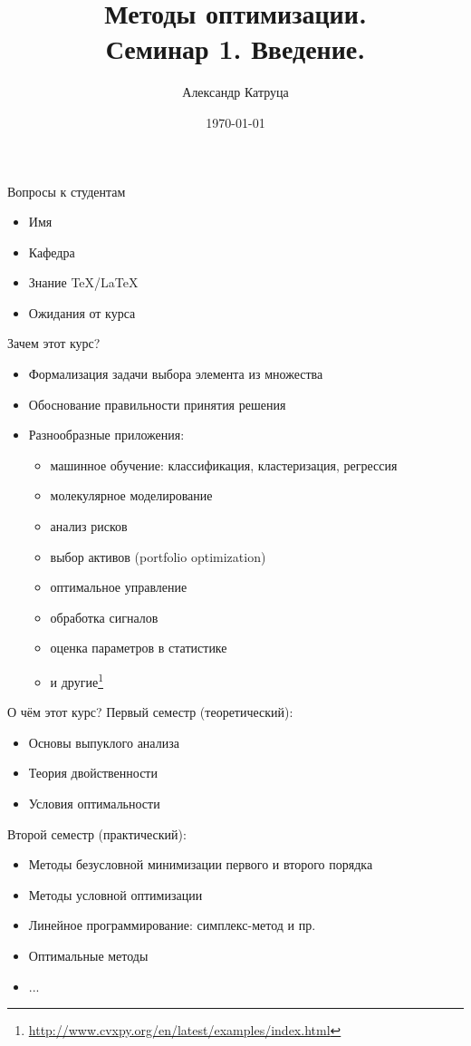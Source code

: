 \documentclass[12pt]{beamer}
\title[Семинар 1]{Методы оптимизации. \\
Семинар 1. Введение.}
\author{Александр Катруца}
\institute{Московский физико-технический институт,\\
Факультет Управления и Прикладной Математики}
\date{\today}
\begin{document}
\begin{frame}
\titlepage
\end{frame}

\begin{frame}{Вопросы к студентам}
\begin{itemize}
\item Имя
\item Кафедра
\item Знание \TeX/\LaTeX
\item Ожидания от курса
\end{itemize}

\end{frame}

\begin{frame}{Зачем этот курс?}
\begin{itemize}
\item Формализация задачи выбора элемента из множества
\item Обоснование правильности принятия решения
\item Разнообразные приложения:
\begin{itemize}
\item машинное обучение: классификация, кластеризация, регрессия
\item молекулярное моделирование
\item анализ рисков
\item выбор активов (portfolio optimization)
\item оптимальное управление
\item обработка сигналов
\item оценка параметров в статистике 
\item и другие\footnote{\url{http://www.cvxpy.org/en/latest/examples/index.html}}
\end{itemize}
\end{itemize}
\end{frame}

\begin{frame}{О чём этот курс?}
Первый семестр (теоретический):
\begin{itemize}
\item Основы выпуклого анализа
\item Теория двойственности
\item Условия оптимальности
\end{itemize}

Второй семестр (практический):
\begin{itemize}
\item Методы безусловной минимизации первого и второго порядка 
\item Методы условной оптимизации
\item Линейное программирование: симплекс-метод и пр.
\item Оптимальные методы
\item ...
\end{itemize}
\end{frame}
\end{document}
